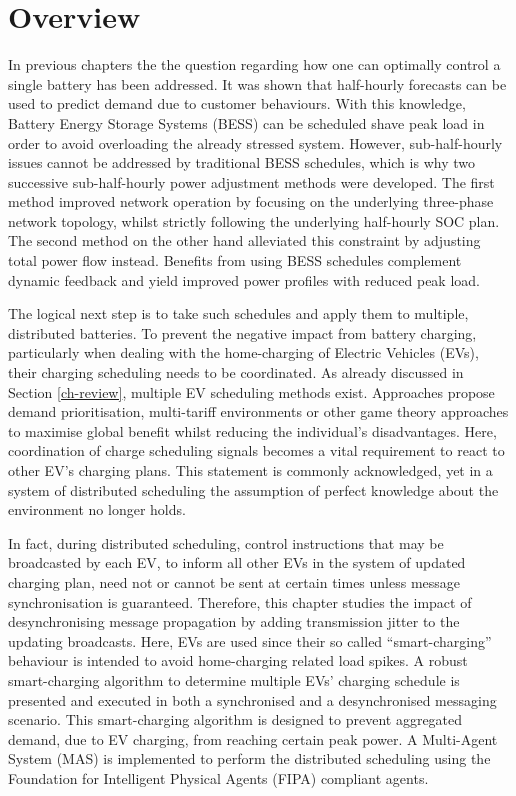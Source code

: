 \section{Overview}
\label{ch3:sec:overview}

In previous chapters the the question regarding how one can optimally control a single battery has been addressed.
It was shown that half-hourly forecasts can be used to predict demand due to customer behaviours.
With this knowledge, Battery Energy Storage Systems (BESS) can be scheduled shave peak load in order to avoid overloading the already stressed system.
However, sub-half-hourly issues cannot be addressed by traditional BESS schedules, which is why two successive sub-half-hourly power adjustment methods were developed.
The first method improved network operation by focusing on the underlying three-phase network topology, whilst strictly following the underlying half-hourly SOC plan.
The second method on the other hand alleviated this constraint by adjusting total power flow instead.
Benefits from using BESS schedules complement dynamic feedback and yield improved power profiles with reduced peak load.

The logical next step is to take such schedules and apply them to multiple, distributed batteries.
To prevent the negative impact from battery charging, particularly when dealing with the home-charging of Electric Vehicles (EVs), their charging scheduling needs to be coordinated.
As already discussed in Section \ref{ch-review}, multiple EV scheduling methods exist.
Approaches propose demand prioritisation, multi-tariff environments or other game theory approaches to maximise global benefit whilst reducing the individual's disadvantages.
Here, coordination of charge scheduling signals becomes a vital requirement to react to other EV's charging plans.
This statement is commonly acknowledged, yet in a system of distributed scheduling the assumption of perfect knowledge about the environment no longer holds.

In fact, during distributed scheduling, control instructions that may be broadcasted by each EV, to inform all other EVs in the system of updated charging plan, need not or cannot be sent at certain times unless message synchronisation is guaranteed.
Therefore, this chapter studies the impact of desynchronising message propagation by adding transmission jitter to the updating broadcasts.
Here, EVs are used since their so called ``smart-charging'' behaviour is intended to avoid home-charging related load spikes.
A robust smart-charging algorithm to determine multiple EVs' charging schedule is presented and executed in both a synchronised and a desynchronised messaging scenario.
This smart-charging algorithm is designed to prevent aggregated demand, due to EV charging, from reaching certain peak power.
A Multi-Agent System (MAS) is implemented to perform the distributed scheduling using the Foundation for Intelligent Physical Agents (FIPA) compliant agents.

